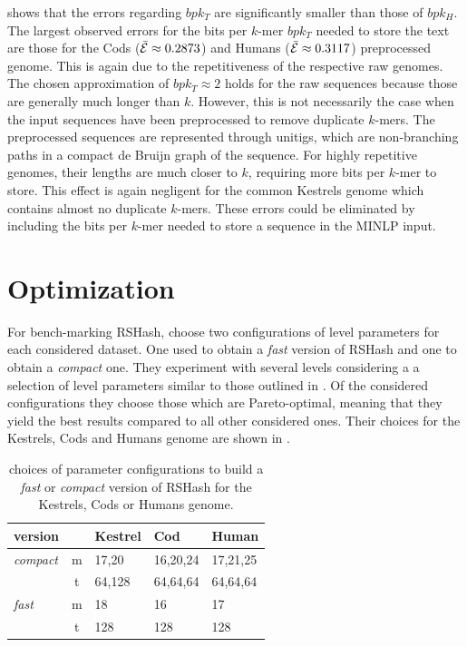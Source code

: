 \documentclass[a4paper,titlepage,onecolumn,oneside,12pt,nenglish,titlepage=firstiscover]{scrbook}
\theoremstyle{plain} %
\theoremstyle{definition} %
\theoremstyle{remark} %
\theoremstyle{plain}
\newcommand{\timeForOperationOnStructure}[2]{T_{#1_{#2}}} %
\begin{document}
 shows that the errors regarding $bpk_T$ are significantly smaller than those of $bpk_H$. The largest observed errors for the bits per $k$-mer $bpk_T$ needed to store the text are those for the Cods ($\bar{\mathcal{E}} \approx 0.2873$) and Humans ($\bar{\mathcal{E}} \approx 0.3117$) preprocessed genome. This is again due to the repetitiveness of the respective raw genomes. The chosen approximation of $bpk_T \approx 2$ holds for the raw sequences because those are generally much longer than $k$. However, this is not necessarily the case when the input sequences have been preprocessed to remove duplicate $k$-mers. The preprocessed sequences are represented through unitigs, which are non-branching paths in a compact de Bruijn graph \cite{doi:10.1089/cmb.2020.0431} of the sequence. For highly repetitive genomes, their lengths are much closer to $k$, requiring more bits per $k$-mer to store. This effect is again negligent for the common Kestrels genome which contains almost no duplicate $k$-mers. These errors could be eliminated by including the bits per $k$-mer needed to store a sequence in the MINLP input.

\section{Optimization} \label{sec:optimization}
\newcommand{\optGoal}[1]{optGoal_{#1}}
\newcommand{\minLookupTime}{\timeForOperationOnStructure{lookup}{}^{min}}
\newcommand{\minSpaceConsumption}{bpk_{total}^{min}}
For bench-marking RSHash, \citet{schulte-mattler_rshash_2026} choose two configurations of level parameters for each considered dataset. One used to obtain a \textit{fast} version of RSHash and one to obtain a \textit{compact} one. They experiment with several levels considering a a selection of level parameters similar to those outlined in . Of the considered configurations they choose those which are Pareto-optimal, meaning that they yield the best results compared to all other considered ones. Their choices for the Kestrels, Cods and Humans genome are shown in .
\begin{table}[h]
	\centering
	\begin{tabular}{lc|lll}
		\toprule
		version & 		& Kestrel	& Cod 		& Human \\
		\midrule
		\textit{compact}& m & 17,20 	& 16,20,24	& 17,21,25 \\
		& t & 64,128	& 64,64,64 	& 64,64,64 \\
		\midrule
		\textit{fast}	& m & 18 		& 16		& 17 \\
		& t & 128		& 128 		& 128 \\
		\bottomrule
	\end{tabular}
	\caption{\citet{schulte-mattler_rshash_2026} choices of parameter configurations to build a \textit{fast} or \textit{compact} version of RSHash for the Kestrels, Cods or Humans genome.} \label{tab:RSHashParetoOptimalParameters}
\end{table}
\end{document}
